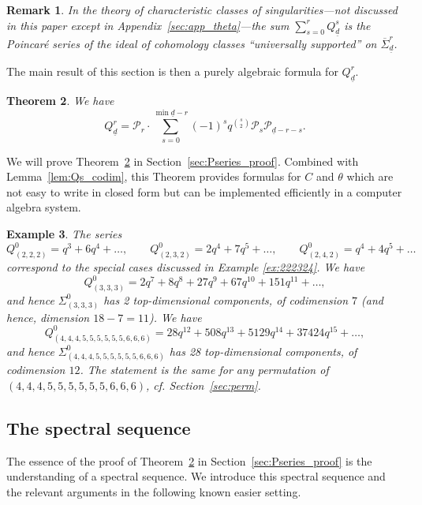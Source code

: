 \documentclass[a4paper]{amsart}
\newcommand{\CP}{\mathcal{P}}
\newcommand{\ud}{\underline{d}}
\newcommand{\cSigma}{\overline{\Sigma}}
\newtheorem{thm}{Theorem}[section]
\theoremstyle{plain}
\newtheorem{example}[thm]{Example}
\newtheorem{remark}[thm]{Remark}
\begin{document}
\begin{remark} \rm
In the theory of characteristic classes of singularities---not discussed in this paper except in Appendix~\ref{sec:app_theta}---the sum $\sum_{s=0}^r Q^s_{\ud}$ is the Poincar\'e series of the ideal of cohomology classes ``universally supported'' on $\cSigma_{\ud}^r$.
\end{remark}

The main result of this section is then a purely algebraic formula for $Q^r_{\ud}$. 

\begin{thm} \label{thm:Pseries}
     We have
  \begin{equation}\label{eq:Fd_formula}
    Q^r_{\ud}=
    \CP_r\cdot \sum_{s=0}^{\min \ud-r} (-1)^s q^{\binom{s}{2}} \CP_s \CP_{\ud-r-s}.    
    \end{equation}
\end{thm}

We will prove Theorem~\ref{thm:Pseries} in Section~\ref{sec:Pseries_proof}.
Combined with Lemma~\ref{lem:Qs_codim}, this Theorem provides formulas for $C$ and $\theta$ which are not easy to write in closed form but can be implemented efficiently in a computer algebra system. 

\begin{example} \rm \label{ex:q-series}
The series 
\[
Q^0_{(2,2,2)}=q^3+6q^4+\ldots,
\qquad
Q^0_{(2,3,2)}=2q^4+7q^5+\ldots,
\qquad
Q^0_{(2,4,2)}=q^4+4q^5+\ldots
\]
correspond to the special cases discussed in Example \ref{ex:222324}.
We have
\[
Q^0_{(3,3,3)}=2q^7+8q^8+27q^9+67q^{10}+151q^{11}+\ldots,
\]
and hence $\Sigma_{(3,3,3)}^0$ has 2 top-dimensional components, of codimension $7$ (and hence, dimension $18-7=11$). We have
\[
Q^0_{(4,4,4,5,5,5,5,5,5,6,6,6)}=28q^{12}+508q^{13}+5129q^{14}+37424q^{15}+\ldots,
\]
and hence $\Sigma_{(4,4,4,5,5,5,5,5,5,6,6,6)}^0$ has 28 top-dimensional components, of codimension $12$. The statement is the same for any permutation of $(4,4,4,5,5,5,5,5,5,6,6,6)$, cf. Section~\ref{sec:perm}.
\end{example}


\subsection{The spectral sequence} %
\label{sec:proof_5gon}
The essence of the proof of Theorem~\ref{thm:Pseries} in Section~\ref{sec:Pseries_proof} is the understanding of a spectral sequence. We introduce this spectral sequence and the relevant arguments in the following known easier setting. 
\end{document}
